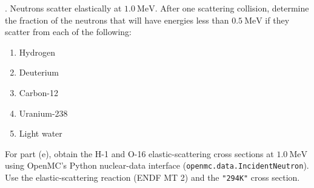 
. Neutrons scatter elastically at $1.0~\mathrm{MeV}$.
After one scattering collision, determine the fraction of the neutrons that
will have energies less than $0.5~\mathrm{MeV}$ if they scatter from each of
the following:
\begin{enumerate}[label=(\alph*)]
\item Hydrogen
\item Deuterium
\item Carbon-12
\item Uranium-238
\item Light water
\end{enumerate}
For part (e), obtain the H-1 and O-16 elastic-scattering cross sections at
$1.0~\mathrm{MeV}$ using OpenMC's Python nuclear-data interface
(\texttt{openmc.data.IncidentNeutron}). Use the elastic-scattering reaction
(ENDF MT 2) and the \texttt{"294K"} cross section.

